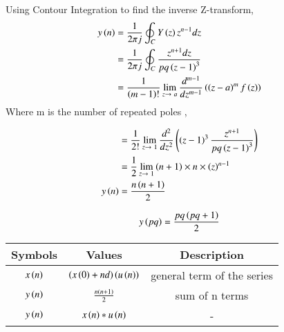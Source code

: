 \documentclass[a4,12pt,twocolumn]{IEEEtran}
\begin{document}
Using Contour Integration to find the inverse Z-transform,
\begin{align}
y\left(n\right) &= \frac{1}{2\pi j}\oint_C Y\left(z\right)z^{n-1}dz \\
&= \frac{1}{2\pi j}\oint_C \frac{z^{n+1}dz}{pq\left(z-1\right)^3} \\
&= \frac{1}{\left(m-1\right)!} \lim_{z\to\ a}\frac{d^{m-1}}{dz^{m-1}} \left(\left(z-a\right)^m f\left(z\right)\right) 
\end{align}
Where m is the number of repeated poles ,

\begin{align}
&= \frac{1}{2!} \lim_{z\to\ 1}\frac{d^2}{dz^2} \left(\left(z-1\right)^3 \frac{z^{n+1}}{pq\left(z-1\right)^3}\right) \\
&= \frac{1}{2} \lim_{z\to\ 1} \left(n+1\right) \times n \times \left(z\right)^{n-1}\\
y\left(n\right) &= \frac{n\left(n+1\right)}{2}
\end{align}

\begin{equation}
y\left(pq\right) = \frac{pq\left(pq+1\right)}{2}
\end{equation}

\begin{tabular}{|c|c|c|}
    \hline
    \textbf{Symbols} & \textbf{Values} & \textbf{Description} \\
    \hline
    $x\left(n\right)$ & $\left(x\left(0\right) + nd\right)\left(u\left(n\right)\right)$ & general term of the series \\
    \hline
    $y\left(n\right)$ & $ \frac{n\left(n+1\right)}{2}$ & sum of n terms \\
    \hline
    $y\left(n\right)$ & $x\left(n\right) * u\left(n\right)$ & - \\
    \hline
\end{tabular}\\
\end{document}
